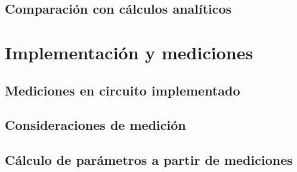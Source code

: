 \documentclass[chaptersright]{informeutn}
\begin{document}
    \subsection{Comparación con cálculos analíticos}
  \section{Implementación y mediciones}
    \subsection{Mediciones en circuito implementado}
    \subsection{Consideraciones de medición}
    \subsection{Cálculo de parámetros a partir de mediciones}
\end{document}
